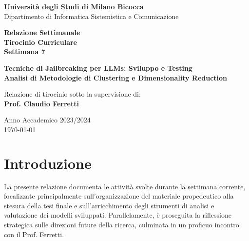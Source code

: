 \documentclass[11pt, a4paper]{article}
\begin{document}
\begin{titlepage}
\begin{center}
    \vspace*{-1cm}
    {\Large\bfseries Università degli Studi di Milano Bicocca}\\[0.5cm]
    {\large Dipartimento di Informatica Sistemistica e Comunicazione}\\[0.5cm]
    
    \vfill
    
    {\Huge\bfseries Relazione Settimanale}\\[0.5cm]
    {\Large\bfseries Tirocinio Curriculare}\\[0.5cm]
    {\large\bfseries Settimana 7}\\[1cm]
    
    \vfill
    
    {\large\bfseries Tecniche di Jailbreaking per LLMs: Sviluppo e Testing\\[0.5cm]
    Analisi di Metodologie di Clustering e Dimensionality Reduction}\\[2cm]
    
    \vfill
    
    {\normalsize
    Relazione di tirocinio sotto la supervisione di:\\
    \textbf{Prof. Claudio Ferretti}}\\[0.5cm]
    
    \vfill
    
    {\normalsize Anno Accademico 2023/2024}\\
    {\normalsize \today}
    
\end{center}
\end{titlepage}

\thispagestyle{empty}
\clearpage

\tableofcontents
\clearpage
{}

\section{Introduzione}
La presente relazione documenta le attività svolte durante la settimana corrente, focalizzate principalmente sull'organizzazione del materiale propedeutico alla stesura della tesi finale e sull'arricchimento degli strumenti di analisi e valutazione dei modelli sviluppati. Parallelamente, è proseguita la riflessione strategica sulle direzioni future della ricerca, culminata in un proficuo incontro con il Prof. Ferretti.
\end{document}

